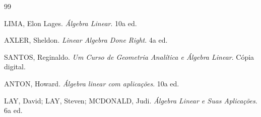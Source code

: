 \documentclass[12pt]{book}
\begin{document}
    \newpage
	\tableofcontents
	

\mainmatter
			
	\newpage
	
	
	
	


\backmatter

	\begin{thebibliography}{99}
		
		LIMA, Elon Lages. \textit{Álgebra Linear}. 10a ed.
		
		AXLER, Sheldon. \textit{Linear Algebra Done Right}. 4a ed.
		
		SANTOS, Reginaldo. \textit{Um Curso de Geometria Analítica e Álgebra Linear}. Cópia digital.
		
		ANTON, Howard. \textit{Álgebra linear com aplicações}. 10a ed.
		
		LAY, David; LAY, Steven; MCDONALD, Judi. \textit{Álgebra Linear e Suas Aplicações}. 6a ed.
		
	\end{thebibliography}
\end{document}
